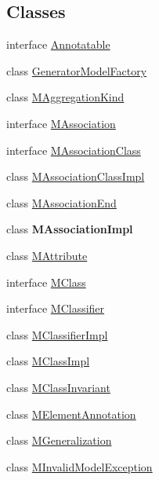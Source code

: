 \subsection*{Classes}
\begin{DoxyCompactItemize}
\item 
interface \hyperlink{interfaceorg_1_1tzi_1_1use_1_1uml_1_1mm_1_1_annotatable}{Annotatable}
\item 
class \hyperlink{classorg_1_1tzi_1_1use_1_1uml_1_1mm_1_1_generator_model_factory}{Generator\-Model\-Factory}
\item 
class \hyperlink{classorg_1_1tzi_1_1use_1_1uml_1_1mm_1_1_m_aggregation_kind}{M\-Aggregation\-Kind}
\item 
interface \hyperlink{interfaceorg_1_1tzi_1_1use_1_1uml_1_1mm_1_1_m_association}{M\-Association}
\item 
interface \hyperlink{interfaceorg_1_1tzi_1_1use_1_1uml_1_1mm_1_1_m_association_class}{M\-Association\-Class}
\item 
class \hyperlink{classorg_1_1tzi_1_1use_1_1uml_1_1mm_1_1_m_association_class_impl}{M\-Association\-Class\-Impl}
\item 
class \hyperlink{classorg_1_1tzi_1_1use_1_1uml_1_1mm_1_1_m_association_end}{M\-Association\-End}
\item 
class {\bfseries M\-Association\-Impl}
\item 
class \hyperlink{classorg_1_1tzi_1_1use_1_1uml_1_1mm_1_1_m_attribute}{M\-Attribute}
\item 
interface \hyperlink{interfaceorg_1_1tzi_1_1use_1_1uml_1_1mm_1_1_m_class}{M\-Class}
\item 
interface \hyperlink{interfaceorg_1_1tzi_1_1use_1_1uml_1_1mm_1_1_m_classifier}{M\-Classifier}
\item 
class \hyperlink{classorg_1_1tzi_1_1use_1_1uml_1_1mm_1_1_m_classifier_impl}{M\-Classifier\-Impl}
\item 
class \hyperlink{classorg_1_1tzi_1_1use_1_1uml_1_1mm_1_1_m_class_impl}{M\-Class\-Impl}
\item 
class \hyperlink{classorg_1_1tzi_1_1use_1_1uml_1_1mm_1_1_m_class_invariant}{M\-Class\-Invariant}
\item 
class \hyperlink{classorg_1_1tzi_1_1use_1_1uml_1_1mm_1_1_m_element_annotation}{M\-Element\-Annotation}
\item 
class \hyperlink{classorg_1_1tzi_1_1use_1_1uml_1_1mm_1_1_m_generalization}{M\-Generalization}
\item 
class \hyperlink{classorg_1_1tzi_1_1use_1_1uml_1_1mm_1_1_m_invalid_model_exception}{M\-Invalid\-Model\-Exception}

\end{DoxyCompactItemize}
